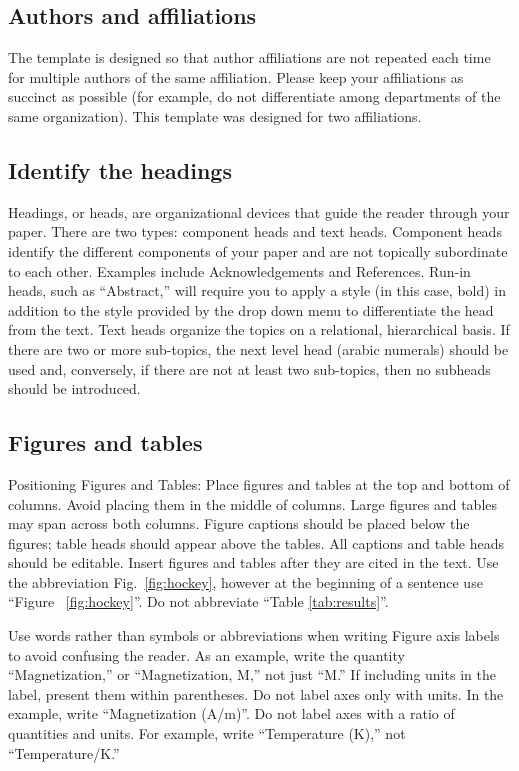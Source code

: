 \documentclass[10pt,twoside,twocolumn,a4paper]{article}
\begin{document}
\subsection{Authors and affiliations}
The template is designed so that author affiliations are not repeated each time for multiple authors of the same affiliation. Please keep your affiliations as succinct as possible (for example, do not differentiate among departments of the same organization). This template was designed for two affiliations.

\subsection{Identify the headings}
Headings, or heads, are organizational devices that guide the reader through your paper. There are two types: component heads and text heads.
Component heads identify the different components of your paper and are not topically subordinate to each other. Examples include Acknowledgements and References. Run-in heads, such as “Abstract,” will require you to apply a style (in this case, bold) in addition to the style provided by the drop down menu to differentiate the head from the text.
Text heads organize the topics on a relational, hierarchical basis. If there are two or more sub-topics, the next level head (arabic numerals) should be used and, conversely, if there are not at least two sub-topics, then no subheads should be introduced.

\subsection{Figures and tables}
Positioning Figures and Tables: Place figures and tables at the top and bottom of columns. Avoid placing them in the middle of columns. Large figures and tables may span across both columns. Figure captions should be placed below the figures; table heads should appear above the tables. All captions and table heads should be editable. Insert figures and tables after they are cited in the text. Use the abbreviation Fig.~\ref{fig:hockey}, however at the beginning of a sentence use ``Figure ~\ref{fig:hockey}''. Do not abbreviate ``Table \ref{tab:results}''.

 Use words rather than symbols or abbreviations when writing Figure axis labels to avoid confusing the reader. As an example, write the quantity ``Magnetization,'' or ``Magnetization, M,'' not just ``M.'' If including units in the label, present them within parentheses. Do not label axes only with units. In the example, write ``Magnetization (A/m)''. Do not label axes with a ratio of quantities and units. For example, write ``Temperature (K),'' not ``Temperature/K.''
\end{document}
